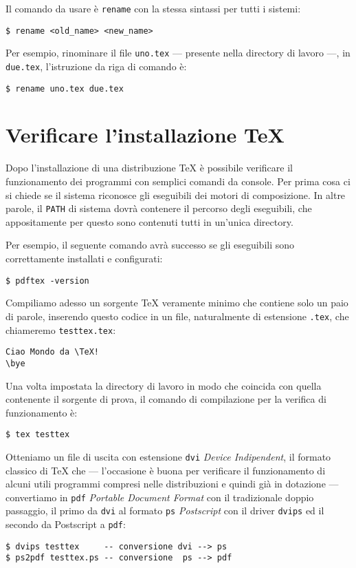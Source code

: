Il comando da usare è \texttt{rename} con la stessa sintassi per tutti i sistemi:

\begin{tcolorbox}
\begin{verbatim}
$ rename <old_name> <new_name>
\end{verbatim}
\end{tcolorbox}

Per esempio, rinominare il file \texttt{uno.tex} --- presente nella directory di lavoro ---, in \texttt{due.tex}, l'istruzione da riga di comando è:
\begin{verbatim}
$ rename uno.tex due.tex
\end{verbatim}

\section{Verificare l'installazione \TeX}

Dopo l'installazione di una distribuzione \TeX{} è possibile verificare il funzionamento dei programmi con semplici comandi da console. Per prima cosa ci si chiede se il sistema riconosce gli eseguibili dei motori di composizione. In altre parole, il \texttt{PATH} di sistema dovrà contenere il percorso degli eseguibili, che appositamente per questo sono contenuti tutti in un'unica directory.

Per esempio, il seguente comando avrà successo se gli eseguibili sono correttamente installati e configurati:
\begin{verbatim}
$ pdftex -version
\end{verbatim}

Compiliamo adesso un sorgente \TeX{} veramente minimo che contiene solo un paio di parole, inserendo questo codice in un file, naturalmente di estensione \texttt{.tex}, che chiameremo \texttt{testtex.tex}:
\begin{verbatim}
Ciao Mondo da \TeX!
\bye
\end{verbatim}

Una volta impostata la directory di lavoro in modo che coincida con quella contenente il sorgente di prova, il comando di compilazione per la verifica di funzionamento è:
\begin{verbatim}
$ tex testtex
\end{verbatim}

Otteniamo un file di uscita con estensione \texttt{dvi} \emph{Device Indipendent}, il formato classico di \TeX{} che --- l'occasione è buona per verificare il funzionamento di alcuni utili programmi compresi nelle distribuzioni e quindi già in dotazione --- convertiamo in \texttt{pdf} \emph{Portable Document Format} con il tradizionale doppio passaggio, il primo da \texttt{dvi} al formato \texttt{ps} \emph{Postscript} con il driver \texttt{dvips} ed il secondo da Postscript a \texttt{pdf}:
\begin{verbatim}
$ dvips testtex     -- conversione dvi --> ps
$ ps2pdf testtex.ps -- conversione  ps --> pdf
\end{verbatim}

